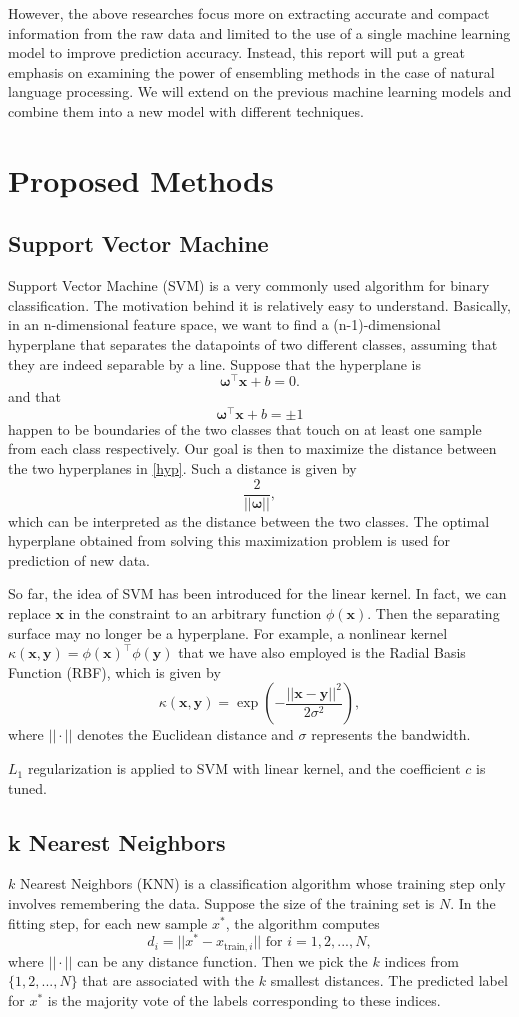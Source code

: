 \documentclass[10pt,twocolumn,letterpage]{article}
\begin{document}
	However, the above researches focus more on extracting accurate and compact information from the raw data and limited to the use of a single machine learning model to improve prediction accuracy. Instead, this report will put a great emphasis on examining the power of ensembling methods in the case of natural language processing. We will extend on the previous machine learning models and combine them into a new model with different techniques.
	\section{Proposed Methods}
	\subsection{Support Vector Machine}
	Support Vector Machine (SVM) is a very commonly used algorithm for binary classification. The motivation behind it is relatively easy to understand. Basically, in an n-dimensional feature space, we want to find a (n-1)-dimensional hyperplane that separates the datapoints of two different classes, assuming that they are indeed separable by a line. Suppose that the hyperplane is $$\bm{\omega}^\top \bm{x} + b = 0.$$ and that \begin{equation}
	\bm{\omega}^\top \bm{x} + b = \pm1 \label{hyp}
	\end{equation} happen to be boundaries of the two classes that touch on at least one sample from each class respectively. Our goal is then to maximize the distance between the two hyperplanes in \ref{hyp}. Such a distance is given by $$\frac{2}{||\bm{\omega}||},$$ which can be interpreted as the distance between the two classes. The optimal hyperplane obtained from solving this maximization problem is used for prediction of new data. 
	
	So far, the idea of SVM has been introduced for the linear kernel. In fact, we can replace $\bm{x}$ in the constraint to an arbitrary function $\phi(\bm{x})$. Then the separating surface may no longer be a hyperplane. For example, a nonlinear kernel $\kappa(\bm{x},\bm{y}) = \phi(\bm{x})^\top \phi(\bm{y})$ that we have also employed is the Radial Basis Function (RBF), which is given by $$\kappa(\bm{x},\bm{y}) = \exp\left(-\frac{||\bm{x}-\bm{y}||^2}{2\sigma^2}\right),$$ where $||\cdot||$ denotes the Euclidean distance and $\sigma$ represents the bandwidth.  
	
	$L_1$ regularization is applied to SVM with linear kernel, and the coefficient $c$ is tuned. 
	\subsection{k Nearest Neighbors}
	$k$ Nearest Neighbors (KNN) is a classification algorithm whose training step only involves remembering the data. Suppose the size of the training set is $N$. In the fitting step, for each new sample $x^*$, the algorithm computes $$d_i = ||x^* - x_{\text{train},i}|| \text{ for } i = 1,2,...,N,$$ where $||\cdot||$ can be any distance function. Then we pick the $k$ indices from $\{1,2,...,N\}$ that are associated with the $k$ smallest distances. The predicted label for $x^*$ is the majority vote of the labels corresponding to these indices. 
	
\end{document}

